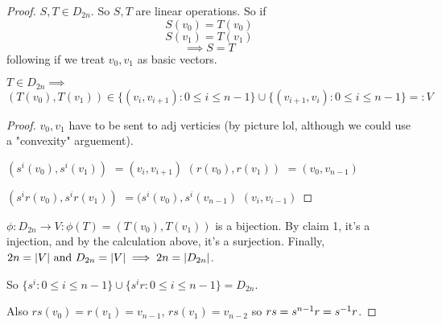 \documentclass[12pt]{article}
\begin{document}
\bboxproof
\begin{proof}
  \(S,T\in D_{2n}\). So \(S,T\) are linear operations. So if
  \[S(v_0)=T(v_0)\]
  \[S(v_1)=T(v_1)\]
  \[\implies S=T\]
  following if we treat \(v_0,v_1\) as basic vectors.

   \(T\in D_{2n}\implies\)
  \[(T(v_0),T(v_1))\in\{(v_i,v_{i+1}):0\le i\le n-1\}
  \cup\{(v_{i+1},v_i):0\le i\le n-1\}=:V\]
  \bboxproof
  \begin{proof}
    \(v_0,v_1\) have to be sent to adj verticies (by picture lol, 
    although we could use a "convexity" arguement).

    $(s^i(v_0),s^i(v_1))$ $=(v_i,v_{i+1})$
    $(r(v_0),r(v_1))$
    $=(v_0,v_{n-1})$

    $(s^ir(v_0),s^ir(v_1))$ $=(s^i(v_0),s^i(v_{n-1})$ $(v_i,v_{i-1})$
  \end{proof}
  \ebox

   \(\phi:D_{2n}\to V:\phi(T)=(T(v_0),T(v_1))\) is a 
  bijection. By claim 1, it's a injection, and by the calculation above,
  it's a surjection. Finally, \(2n=|V|\text{ and }D_{2n}=|V|\implies 2n=|D_{2n}|\).

  So \(\{s^i:0\le i\le n-1\}\cup\{s^ir:0\le i\le n-1\}=D_{2n}\).

  Also \(rs(v_0)=r(v_1)=v_{n-1}\), \(rs(v_1)=v_{n-2}\) so
  \(rs=s^{n-1}r=s^{-1}r\).
\end{proof}
\ebox


\end{document}
